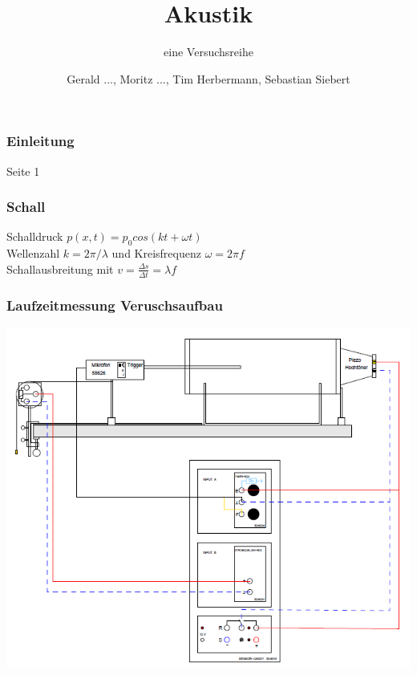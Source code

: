 \documentclass[11pt]{beamer}
\begin{document}
	\author{Gerald ..., Moritz ..., Tim Herbermann, Sebastian Siebert}
	\title{Akustik}
	\subtitle{eine Versuchsreihe}
	\frame[plain]{\maketitle}
	
	\begin{frame}
		\frametitle{Einleitung}
		Seite 1
	\end{frame}

	\begin{frame}
		\frametitle{Schall}
		Schalldruck  $p(x, t) = p_0 cos(kt + \omega t)$ \\
		Wellenzahl $k = 2\pi / \lambda$ und Kreisfrequenz $\omega = 2\pi f$\\ [0,3cm]
		
		Schallausbreitung mit $v = \frac{\Delta s}{\Delta t} = \lambda f$\\ [0,3cm]
		
		
	\end{frame}

	\begin{frame}
		\frametitle{Laufzeitmessung \qquad Veruschsaufbau}
		\begin{center}
			\includegraphics[width=0.8\linewidth]{aufbau_laufzeitmessung}
		\end{center}
	\end{frame}
\end{document}
